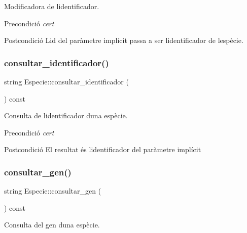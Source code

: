 Modificadora de l\textquotesingle{}identificador. 

\begin{DoxyPrecond}{Precondició}
{\itshape cert} 
\end{DoxyPrecond}
\begin{DoxyPostcond}{Postcondició}
L\textquotesingle{}id del paràmetre implícit passa a ser l\textquotesingle{}identificador de l\textquotesingle{}espècie. 
\end{DoxyPostcond}
\mbox{\label{class_especie_a131d45ad81466f5368f52e5f0579d1d6}} 
\subsubsection{\texorpdfstring{consultar\+\_\+identificador()}{consultar\_identificador()}}
{\footnotesize\ttfamily string Especie\+::consultar\+\_\+identificador (\begin{DoxyParamCaption}{ }\end{DoxyParamCaption}) const}



Consulta de l\textquotesingle{}identificador d\textquotesingle{}una espècie. 

\begin{DoxyPrecond}{Precondició}
{\itshape cert} 
\end{DoxyPrecond}
\begin{DoxyPostcond}{Postcondició}
El resultat és l\textquotesingle{}identificador del paràmetre implícit 
\end{DoxyPostcond}
\mbox{\label{class_especie_a850af2b59a21e2d801c59d76ba5c1a98}} 
\subsubsection{\texorpdfstring{consultar\+\_\+gen()}{consultar\_gen()}}
{\footnotesize\ttfamily string Especie\+::consultar\+\_\+gen (\begin{DoxyParamCaption}{ }\end{DoxyParamCaption}) const}



Consulta del gen d\textquotesingle{}una espècie. 

